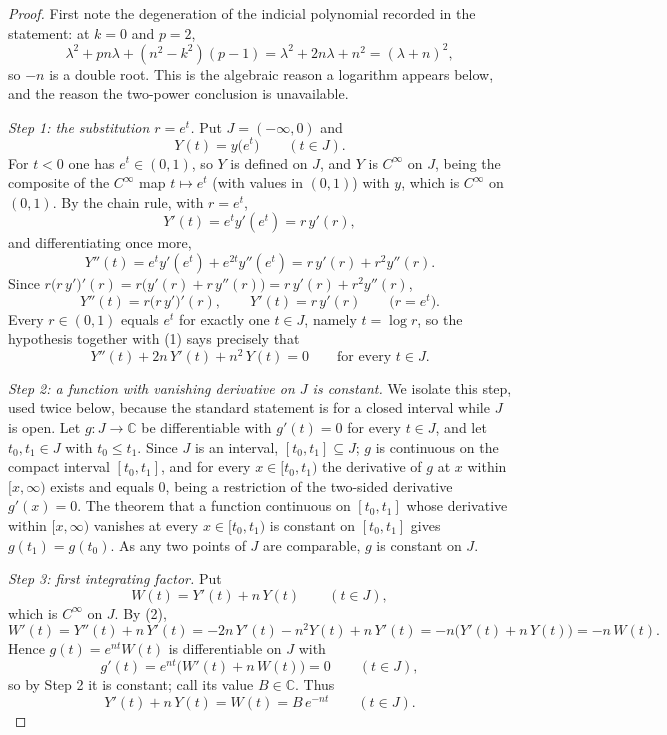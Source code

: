 \begin{proof}
First note the degeneration of the indicial polynomial recorded in the
statement: at $k=0$ and $p=2$,
\[
  \lambda^2+pn\lambda+(n^2-k^2)(p-1)=\lambda^2+2n\lambda+n^2=(\lambda+n)^2 ,
\]
so $-n$ is a double root.  This is the algebraic reason a logarithm appears
below, and the reason the two-power conclusion is unavailable.

\emph{Step 1: the substitution $r=e^{t}$.}  Put $J=(-\infty,0)$ and
\[
  Y(t)=y\bigl(e^{t}\bigr)\qquad(t\in J).
\]
For $t<0$ one has $e^{t}\in(0,1)$, so $Y$ is defined on $J$, and $Y$ is
$C^\infty$ on $J$, being the composite of the $C^\infty$ map $t\mapsto e^{t}$
(with values in $(0,1)$) with $y$, which is $C^\infty$ on $(0,1)$.  By the chain
rule, with $r=e^{t}$,
\[
  Y'(t)=e^{t}y'(e^{t})=r\,y'(r),
\]
and differentiating once more,
\[
  Y''(t)=e^{t}y'(e^{t})+e^{2t}y''(e^{t})=r\,y'(r)+r^{2}y''(r).
\]
Since $r\bigl(r\,y'\bigr)'(r)=r\bigl(y'(r)+r\,y''(r)\bigr)=r\,y'(r)+r^{2}y''(r)$,
\begin{equation}\tag{1}
  Y''(t)=r\bigl(r\,y'\bigr)'(r),\qquad Y'(t)=r\,y'(r)\qquad\bigl(r=e^{t}\bigr).
\end{equation}
Every $r\in(0,1)$ equals $e^{t}$ for exactly one $t\in J$, namely $t=\log r$, so
the hypothesis together with (1) says precisely that
\begin{equation}\tag{2}
  Y''(t)+2n\,Y'(t)+n^2\,Y(t)=0\qquad\text{for every }t\in J .
\end{equation}

\emph{Step 2: a function with vanishing derivative on $J$ is constant.}  We
isolate this step, used twice below, because the standard statement is for a
closed interval while $J$ is open.  Let $g\colon J\to\mathbb{C}$ be
differentiable with $g'(t)=0$ for every $t\in J$, and let $t_0,t_1\in J$ with
$t_0\le t_1$.  Since $J$ is an interval, $[t_0,t_1]\subseteq J$; $g$ is
continuous on the compact interval $[t_0,t_1]$, and for every $x\in[t_0,t_1)$
the derivative of $g$ at $x$ within $[x,\infty)$ exists and equals $0$, being a
restriction of the two-sided derivative $g'(x)=0$.  The theorem that a function
continuous on $[t_0,t_1]$ whose derivative within $[x,\infty)$ vanishes at every
$x\in[t_0,t_1)$ is constant on $[t_0,t_1]$ gives $g(t_1)=g(t_0)$.  As any two
points of $J$ are comparable, $g$ is constant on $J$.

\emph{Step 3: first integrating factor.}  Put
\[
  W(t)=Y'(t)+n\,Y(t)\qquad(t\in J),
\]
which is $C^\infty$ on $J$.  By (2),
\[
  W'(t)=Y''(t)+n\,Y'(t)=-2n\,Y'(t)-n^2Y(t)+n\,Y'(t)
  =-n\bigl(Y'(t)+n\,Y(t)\bigr)=-n\,W(t).
\]
Hence $g(t)=e^{nt}W(t)$ is differentiable on $J$ with
\[
  g'(t)=e^{nt}\bigl(W'(t)+n\,W(t)\bigr)=0\qquad(t\in J),
\]
so by Step 2 it is constant; call its value $B\in\mathbb{C}$.  Thus
\begin{equation}\tag{3}
  Y'(t)+n\,Y(t)=W(t)=B\,e^{-nt}\qquad(t\in J).
\end{equation}


\end{proof}
